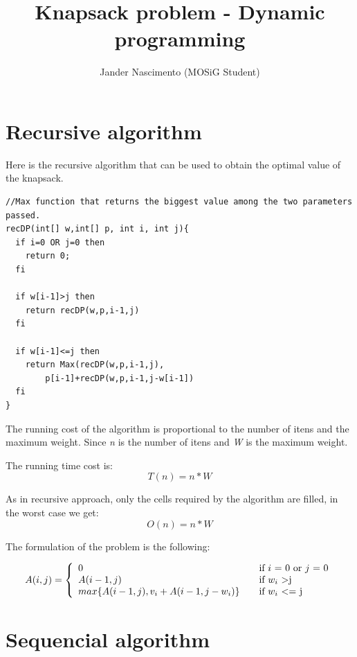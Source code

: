 \documentclass{article}
\begin{document}
\title{Knapsack problem - Dynamic programming}

\author{Jander Nascimento (MOSiG Student)}

\maketitle

\tableofcontents

\section{Recursive algorithm}

Here is the recursive algorithm\cite{algojava} that can be used to obtain the optimal value of the knapsack.

\begin{lstlisting}
//Max function that returns the biggest value among the two parameters passed.
recDP(int[] w,int[] p, int i, int j){
  if i=0 OR j=0 then 
    return 0;
  fi

  if w[i-1]>j then
    return recDP(w,p,i-1,j)
  fi

  if w[i-1]<=j then
    return Max(recDP(w,p,i-1,j),
 		p[i-1]+recDP(w,p,i-1,j-w[i-1])
  fi
}
\end{lstlisting}

The running cost of the algorithm is proportional to the number of itens and the maximum weight. 
Since \textit{n} is the number of itens and \textit{W} is the maximum weight.

The running time cost is:
\[
T(n)=n*W
\]

As in recursive approach, only the cells required by the algorithm are filled, in the worst case we get:
\[
O(n)=n*W
\]

The formulation of the problem is the following:

\[
  A(i,j) = \left\{ 
  \begin{array}{l l}
    0 & \quad \textnormal{if $i$ = 0 or $j$ = 0}\\
    A(i-1,j) & \quad \textnormal{if $w_i$ \textgreater j}\\
    max\{A(i-1,j),v_i+A(i-1,j-w_i)\} & \quad \textnormal{if $w_i$ \textless= j}\\
  \end{array} \right.
\]

\section{Sequencial algorithm}          
\end{document}
